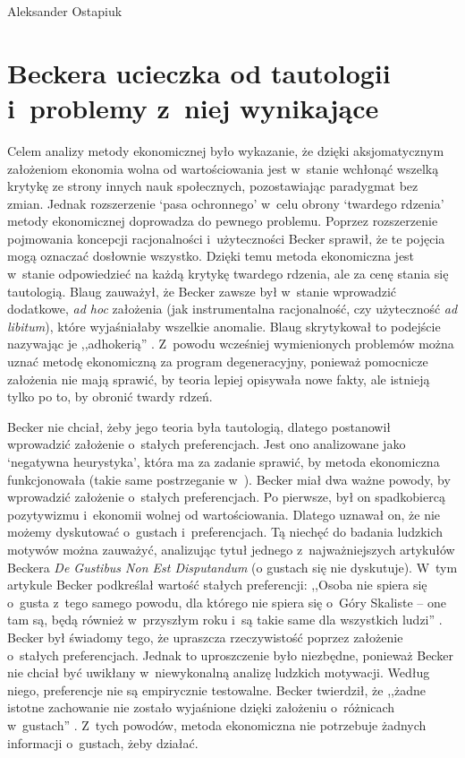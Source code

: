 \begin{artplenv}{Aleksander Ostapiuk}
\section{Beckera ucieczka od tautologii i~problemy z~niej wynikające}
Celem analizy metody ekonomicznej było wykazanie, że dzięki aksjomatycznym założeniom ekonomia wolna od wartościowania
jest w~stanie wchłonąć wszelką krytykę ze strony innych nauk społecznych, pozostawiając paradygmat bez zmian. Jednak
rozszerzenie `pasa ochronnego' w~celu obrony `twardego rdzenia' metody ekonomicznej doprowadza do pewnego problemu.
Poprzez rozszerzenie pojmowania koncepcji racjonalności i~użyteczności Becker sprawił, że te pojęcia mogą oznaczać
dosłownie wszystko. Dzięki temu metoda ekonomiczna jest w~stanie odpowiedzieć na każdą krytykę twardego rdzenia, ale za
cenę stania się tautologią. Blaug zauważył, że Becker zawsze był w~stanie wprowadzić dodatkowe, \textit{ad hoc}
założenia (jak instrumentalna racjonalność, czy użyteczność \textit{ad libitum}), które wyjaśniałaby wszelkie
anomalie. Blaug skrytykował to podejście nazywając je ,,adhokerią''
\parencite[s.~325–326]{blaug_metodologia_1995}.
Z~powodu wcześniej wymienionych problemów można uznać metodę ekonomiczną za program degeneracyjny, ponieważ pomocnicze
założenia nie mają sprawić, by teoria lepiej opisywała nowe fakty, ale istnieją tylko po to, by obronić twardy rdzeń. 

Becker nie chciał, żeby jego teoria była tautologią, dlatego postanowił wprowadzić założenie o~stałych preferencjach.
Jest ono analizowane jako `negatywna heurystyka', która ma za zadanie sprawić, by metoda ekonomiczna funkcjonowała
(takie same postrzeganie w~\parencite[s.~323–324]{blaug_metodologia_1995}).
Becker miał dwa ważne powody, by
wprowadzić założenie o~stałych preferencjach. Po pierwsze, był on spadkobiercą pozytywizmu i~ekonomii wolnej od
wartościowania. Dlatego uznawał on, że nie możemy dyskutować o~gustach i~preferencjach. Tą niechęć do badania ludzkich
motywów można zauważyć, analizując tytuł jednego z~najważniejszych artykułów Beckera \textit{De Gustibus Non Est
Disputandum} (o gustach się nie dyskutuje). W~tym artykule Becker podkreślał wartość stałych preferencji: ,,Osoba nie
spiera się o~gusta z~tego samego powodu, dla którego nie spiera się o~Góry Skaliste -- one tam są, będą
również w~przyszłym roku i~są takie same dla wszystkich ludzi''
\parencite[s.~76]{becker_gustibus_1977}.
Becker
był świadomy tego, że upraszcza rzeczywistość poprzez założenie o~stałych preferencjach. Jednak to uproszczenie było
niezbędne, ponieważ Becker nie chciał być uwikłany w~niewykonalną analizę ludzkich motywacji. Według niego, preferencje
nie są empirycznie testowalne. Becker twierdził, że ,,żadne istotne zachowanie nie zostało wyjaśnione dzięki
założeniu o~różnicach w~gustach''
\parencite[ s.~89]{becker_gustibus_1977}.
Z~tych powodów, metoda ekonomiczna nie
potrzebuje żadnych informacji o~gustach, żeby działać. 


\end{artplenv}

